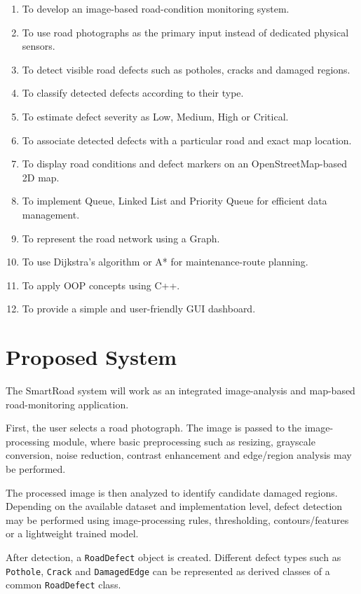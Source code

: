 \documentclass[12pt,a4paper]{article}
\begin{document}
\begin{enumerate}[leftmargin=*]
    \item To develop an image-based road-condition monitoring system.
    \item To use road photographs as the primary input instead of dedicated physical sensors.
    \item To detect visible road defects such as potholes, cracks and damaged regions.
    \item To classify detected defects according to their type.
    \item To estimate defect severity as Low, Medium, High or Critical.
    \item To associate detected defects with a particular road and exact map location.
    \item To display road conditions and defect markers on an OpenStreetMap-based 2D map.
    \item To implement Queue, Linked List and Priority Queue for efficient data management.
    \item To represent the road network using a Graph.
    \item To use Dijkstra's algorithm or A* for maintenance-route planning.
    \item To apply OOP concepts using C++.
    \item To provide a simple and user-friendly GUI dashboard.
\end{enumerate}

\section{Proposed System}

The SmartRoad system will work as an integrated image-analysis and map-based road-monitoring application.

First, the user selects a road photograph. The image is passed to the image-processing module, where basic preprocessing such as resizing, grayscale conversion, noise reduction, contrast enhancement and edge/region analysis may be performed.

The processed image is then analyzed to identify candidate damaged regions. Depending on the available dataset and implementation level, defect detection may be performed using image-processing rules, thresholding, contours/features or a lightweight trained model.

After detection, a \texttt{RoadDefect} object is created. Different defect types such as \texttt{Pothole}, \texttt{Crack} and \texttt{DamagedEdge} can be represented as derived classes of a common \texttt{RoadDefect} class.
\end{document}

